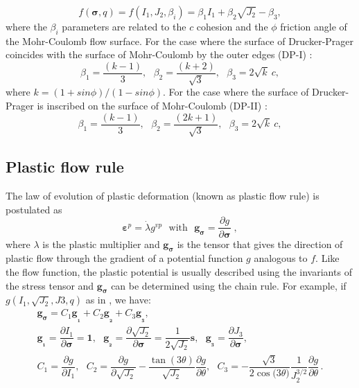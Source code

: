 \documentclass[Journal,letterpaper]{ascelike-new}
\newcommand{\strainp}{\boldsymbol{\varepsilon}^{p}}
\newcommand{\sll}{\boldsymbol{s}}
\newcommand{\onell}{\boldsymbol{1}}
\newcommand{\dgds}{\boldsymbol{g_\sigma}}
\newcommand{\gllum}{\boldsymbol {g_{_1}}}
\newcommand{\glldois}{\boldsymbol {g_{_2}}}
\newcommand{\glltres}{\boldsymbol {g_{_3}}}
\newcommand{\gvp}{g^{vp}}
\newcommand{\stress}{\boldsymbol{\sigma}}
\begin{document}
\begin{equation}
	\label{eq:f_Drucker_Prager}
	f(\stress,q) = f(I_1,J_2,\beta_i) = \beta_1 I_1 +\beta_2 \sqrt{J_2}-\beta_3,
\end{equation}
where the $\beta_i$ parameters are related to the $c$ cohesion and the $\phi$ friction angle of the Mohr-Coulomb flow surface. For the case where the surface of Drucker-Prager coincides with the surface of Mohr-Coulomb by the outer edges (DP-I) \cite{bernaud1991}:
\begin{equation}
	\label{eq:f_DP_circunscrita_MC}
	\beta_1 = \dfrac{(k-1)}{3}, ~~~ \beta_2 = \dfrac{(k+2)}{\sqrt{3}}, ~~~
	\beta_3 = 2\sqrt{k}~c,
\end{equation}
where $k = (1+sin{\phi})/(1-sin{\phi})$. For the case where the surface of Drucker-Prager is inscribed on the surface of Mohr-Coulomb (DP-II) \cite{bernaud1991}:
\begin{equation}
	\label{eq:f_DP_inscrita_MC}
	\beta_1 = \dfrac{(k-1)}{3}, ~~~ \beta_2 = \dfrac{(2k+1)}{\sqrt{3}}, ~~~
	\beta_3 = 2\sqrt{k}~c,
\end{equation}

\subsection{Plastic flow rule}

The law of evolution of plastic deformation (known as plastic flow rule) is postulated as
\begin{equation} \label{eq_plastic_flow}
	\strainp = \dot \lambda \gvp ~~~ \text{with} ~~~ \dgds = \dfrac{\partial g}{\partial \stress} \;,
\end{equation}
where $\lambda$ is the plastic multiplier and $\dgds$ is the tensor that gives the direction of plastic flow through the gradient of a potential function $g$ analogous to $f$. Like the flow function, the plastic potential is usually described using the invariants of the stress tensor and $\dgds$ can be determined using the chain rule. For example, if $g(I_1,\sqrt{J_2},J3,q)$ as in , we have:
\begin{equation} \label{eq_direction_plastic_flow}
	\begin{array}{lcl}
	\dgds = C_1\gllum + C_2\glldois + C_3\glltres, \\ 
	\gllum = \dfrac{\partial I_1}{\partial \stress} = \onell,~~~ \glldois = \dfrac{\partial \sqrt{J_2}}{\partial \stress} = \dfrac{1}{2\sqrt{J_2}}\sll,~~~ \glltres = \dfrac{\partial J_3}{\partial \stress}, \\
	C_1 = \dfrac{\partial g}{\partial I_1},~~~C_2=\dfrac{\partial g}{\partial \sqrt{J_2}}-\dfrac{\tan{(3\theta)}}{\sqrt{J_2}}\dfrac{\partial g}{\partial \theta},~~~C_3 = -\dfrac{\sqrt{3}}{2\cos{(3\theta})}\dfrac{1}{J_2^{3/2}}\dfrac{\partial g}{\partial \theta} \,.
\end{array}
\end{equation}
\end{document}
